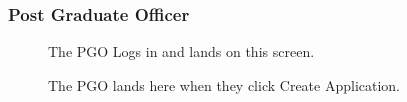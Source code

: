 \documentclass[11pt]{article}
\begin{document}
\subsubsection{Post Graduate Officer}
\begin{figure}[H]
	\caption{
		The PGO Logs in and lands on this screen.}
\end{figure}
\begin{figure}[H]
	\caption{
		The PGO lands here when they click Create Application.}
\end{figure}
\end{document}
